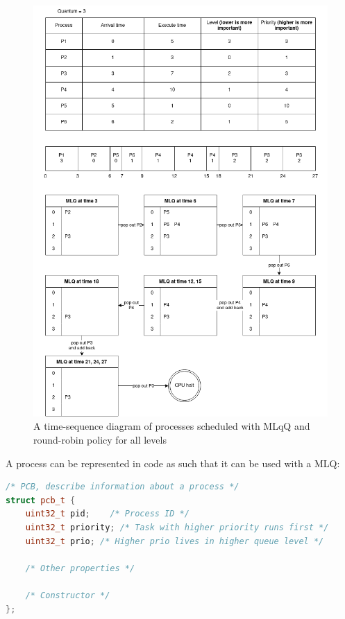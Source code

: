 \documentclass[]{article}
\begin{document}
\begin{figure}[h]
	\caption{A time-sequence diagram of processes scheduled with MLqQ and round-robin policy for all levels}
	\centering
	\includegraphics[height=0.5\textheight]{content/mlq_diagram.png}
\end{figure}
A process can be represented in code as such that it can be used with a MLQ:
\begin{lstlisting}[language=C++]
/* PCB, describe information about a process */
struct pcb_t {
	uint32_t pid;    /* Process ID */
	uint32_t priority; /* Task with higher priority runs first */
	uint32_t prio; /* Higher prio lives in higher queue level */
		
	/* Other properties */
		
	/* Constructor */
};
\end{lstlisting}
\newpage
\end{document}
